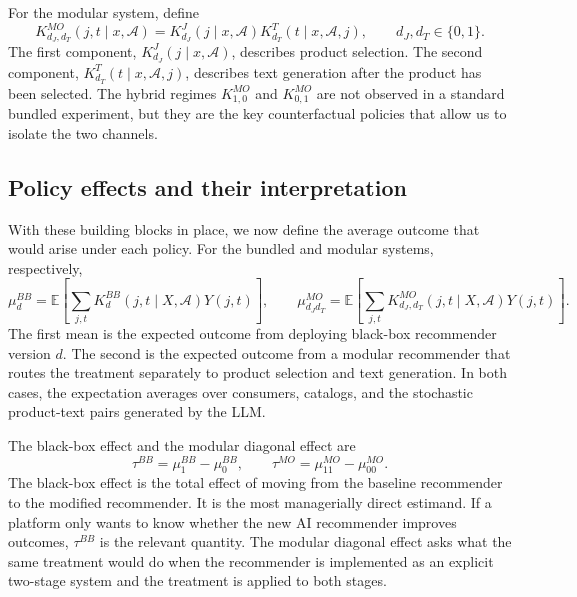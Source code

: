 \documentclass[11pt]{article}
\newcommand{\Expect}{\mathbb{E}}
\newcommand{\Y}{Y}
\newcommand{\catalog}{\mathcal{A}}
\begin{document}
For the modular system, define
\begin{equation}
K^{MO}_{d_J,d_T}(j,t \mid x,\catalog) = K^J_{d_J}(j \mid x,\catalog) K^T_{d_T}(t \mid x,\catalog,j), \qquad d_J,d_T \in \{0,1\}.
\label{eq:kernel-modular}
\end{equation}
The first component, $K^J_{d_J}(j \mid x,\catalog)$, describes product selection. The second component, $K^T_{d_T}(t \mid x,\catalog,j)$, describes text generation after the product has been selected. The hybrid regimes $K^{MO}_{1,0}$ and $K^{MO}_{0,1}$ are not observed in a standard bundled experiment, but they are the key counterfactual policies that allow us to isolate the two channels.

\subsection{Policy effects and their interpretation}

With these building blocks in place, we now define the average outcome that would arise under each policy. For the bundled and modular systems, respectively,
\begin{equation}
\mu_d^{BB} = \Expect\!\left[\sum_{j,t} K^{BB}_d(j,t \mid X,\catalog)\Y(j,t)\right], \qquad \mu_{d_Jd_T}^{MO} = \Expect\!\left[\sum_{j,t} K^{MO}_{d_J,d_T}(j,t \mid X,\catalog)\Y(j,t)\right].
\label{eq:policy-means}
\end{equation}
The first mean is the expected outcome from deploying black-box recommender version $d$. The second is the expected outcome from a modular recommender that routes the treatment separately to product selection and text generation. In both cases, the expectation averages over consumers, catalogs, and the stochastic product-text pairs generated by the LLM.

The black-box effect and the modular diagonal effect are
\begin{equation}
\tau^{BB} = \mu_1^{BB} - \mu_0^{BB}, \qquad \tau^{MO} = \mu_{11}^{MO} - \mu_{00}^{MO}.
\label{eq:main-policy-effects}
\end{equation}
The black-box effect is the total effect of moving from the baseline recommender to the modified recommender. It is the most managerially direct estimand. If a platform only wants to know whether the new AI recommender improves outcomes, $\tau^{BB}$ is the relevant quantity. The modular diagonal effect asks what the same treatment would do when the recommender is implemented as an explicit two-stage system and the treatment is applied to both stages.
\end{document}

